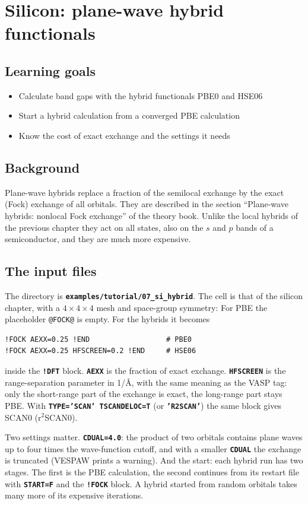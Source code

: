 \documentclass[11pt,a4paper,oneside]{book}
\newcommand{\key}[1]{\textbf{\texttt{#1}}}
\newcommand{\file}[1]{\textbf{\texttt{#1}}}
\newcommand{\deck}[1]{{\small}}
\newcommand{\goals}{\section{Learning goals}}
\newcommand{\background}{\section{Background}}
\begin{document}
\chapter{Silicon: plane-wave hybrid functionals}
\minitoc

\goals
\begin{itemize}
\item Calculate band gaps with the hybrid functionals PBE0 and HSE06
\item Start a hybrid calculation from a converged PBE calculation
\item Know the cost of exact exchange and the settings it needs
\end{itemize}

\background
Plane-wave hybrids replace a fraction of the semilocal exchange by the
exact (Fock) exchange of all orbitals. They are described in the
section ``Plane-wave hybrids: nonlocal Fock exchange'' of the theory
book. Unlike the local hybrids of the previous chapter they act on all
states, also on the $s$ and $p$ bands of a semiconductor, and they are
much more expensive.

\section{The input files}

The directory is \file{examples/tutorial/07\_si\_hybrid}. The cell is that
of the silicon chapter, with a $4\times4\times4$ mesh and space-group symmetry:
\deck{../../../examples/tutorial/07_si_hybrid/si.strc}
\deck{../../../examples/tutorial/07_si_hybrid/si.cntl}
For PBE the placeholder \texttt{@FOCK@} is empty. For the hybrids it
becomes
\begin{verbatim}
!FOCK AEXX=0.25 !END                  # PBE0
!FOCK AEXX=0.25 HFSCREEN=0.2 !END     # HSE06
\end{verbatim}
inside the \key{!DFT} block. \key{AEXX} is the fraction of exact
exchange. \key{HFSCREEN} is the range-separation parameter in
1/\AA, with the same meaning as the VASP tag: only the short-range part
of the exchange is exact, the long-range part stays PBE. With
\key{TYPE='SCAN' TSCANDELOC=T} (or \key{'R2SCAN'}) the same block gives
SCAN0 (r$^2$SCAN0).

Two settings matter. \key{CDUAL=4.0}: the product of two orbitals
contains plane waves up to four times the wave-function cutoff, and
with a smaller \key{CDUAL} the exchange is truncated (VESPAW prints a
warning). And the start: each hybrid run has two stages. The first is
the PBE calculation, the second continues from its restart file with
\key{START=F} and the \key{!FOCK} block. A hybrid started from random
orbitals takes many more of its expensive iterations.
\end{document}
